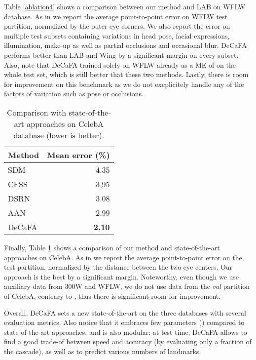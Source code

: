 \documentclass[10pt,twocolumn,letterpaper]{article}
\begin{document}
Table \ref{ablation4} shows a comparison between our method and LAB \cite{wu2018look} on WFLW database. As in \cite{wu2018look} we report the average point-to-point error on WFLW test partition, normalized by the outer eye corners. We also report the error on multiple test subsets containing variations in head pose, facial expressions, illumination, make-up as well as partial occlusions and occasional blur. DeCaFA performs better than LAB \cite{wu2018look} and Wing \cite{feng2018wing} by a significant margin on every subset. Also, note that DeCaFA trained solely on WFLW already as a ME of  on the whole test set, which is still better that these two methods. Lastly, there is room for improvement on this benchmark as we do not excplicitely handle any of the factors of variation such as pose or occlusions.

\begin{table}[h!]
	\caption{Comparison with state-of-the-art approaches on CelebA database (lower is better).}
	\label{ablation3}
	\begin{tabular}{l|r}
		\hline
		Method & Mean error (\%) \\
		\hline
		SDM \cite{Xiong2013}   & 4.35  \\
		CFSS \cite{zhu2015face}   & 3,95  \\
		DSRN \cite{miao2018direct}   & 3.08  \\
		AAN \cite{yue2018attentional} & 2.99 \\
		\hline
		DeCaFA       & \textbf{2.10} \\
		\hline
	\end{tabular}
\end{table}

Finally, Table \ref{ablation3} shows a comparison of our method and state-of-the-art approaches on CelebA. As in \cite{Xiong2013,zhu2015face,miao2018direct,yue2018attentional} we report the average point-to-point error on the test partition, normalized by the distance between the two eye centers. Our approach is the best by a significant margin. Noteworthy, even though we use auxiliary data from 300W and WFLW, we do not use data from the \textit{val} partition of CelebA, contrary to \cite{miao2018direct,yue2018attentional}, thus there is significant room for improvement.

Overall, DeCaFA sets a new state-of-the-art on the three databases with several evaluation metrics. Also notice that it embraces few parameters () compared to state-of-the-art approaches, and is also modular: at test time, DeCaFA allows to find a good trade-of between speed and accuracy (by evaluating only a fraction of the cascade), as well as to predict various numbers of landmarks.
\end{document}
